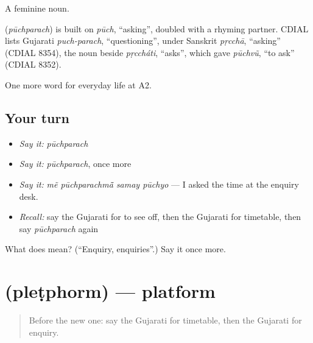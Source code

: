 A feminine noun.

\begin{cousinweb}
\textbf{} (\emph{pūchparach}) is built on \emph{pūch}, \textquotedblleft{}asking\textquotedblright{}, doubled with a rhyming partner. CDIAL lists Gujarati \emph{puch-parach}, \textquotedblleft{}questioning\textquotedblright{}, under Sanskrit \emph{pṛcchā}, \textquotedblleft{}asking\textquotedblright{} (CDIAL 8354), the noun beside \emph{pṛccháti}, \textquotedblleft{}asks\textquotedblright{}, which gave \emph{pūchvũ}, \textquotedblleft{}to ask\textquotedblright{} (CDIAL 8352).
\end{cousinweb}

\begin{grammarlens}[title={What you've built}]
One more word for everyday life at A2.
\end{grammarlens}

\subsection*{Your turn}
\begin{itemize}
\raggedright
  \item \emph{Say it:} \emph{pūchparach}
  \item \emph{Say it:} \emph{pūchparach}, once more
  \item \emph{Say it:} \emph{mẽ pūchparachmā̃ samay pūchyo} — I asked the time at the enquiry desk.
  \item \emph{Recall:} say the Gujarati for to see off, then the Gujarati for timetable, then say \emph{pūchparach} again
\end{itemize}

\begin{tcolorbox}[breakable,colback=teal!4,colframe=teal!35!black,title={Before you move on}]
What does  mean? (\textquotedblleft{}Enquiry, enquiries\textquotedblright{}.) Say it once more.
\end{tcolorbox}
\section[\texorpdfstring{\gu{પ્લેટફોર્મ} (pleṭphorm)}{પ્લેટફોર્મ (pleṭphorm)}]{ (pleṭphorm) — platform}

\label{lesson:GU-C204-pletphorm}



\begin{quote}
Before the new one: say the Gujarati for timetable, then the Gujarati for enquiry.
\end{quote}

